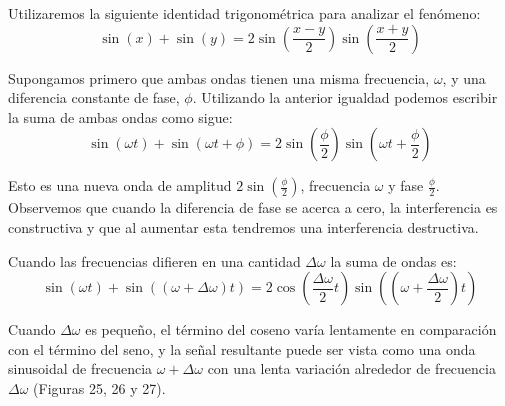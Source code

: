 \documentclass[11pt,a4paper]{article}
\begin{document}
	Utilizaremos la siguiente identidad trigonométrica para analizar el fenómeno:
	$$ \sin(x) + \sin (y) = 2 \sin \left( \frac{x - y}{2} \right) \sin \left( \frac{x + y}{2} \right)$$
	
	Supongamos primero que ambas ondas tienen una misma frecuencia, $\omega$, y una diferencia constante de fase, $\phi$. Utilizando la anterior igualdad podemos escribir la suma de ambas ondas como sigue:
	$$ \sin (\omega t) + \sin (\omega t + \phi) = 2 \sin \left(\frac{\phi}{2} \right) \sin \left( \omega t  + \frac{\phi}{2} \right) $$
	
	Esto es  una nueva onda de amplitud $2 \sin \left( \frac{\phi}{2} \right) $, frecuencia $ \omega $ y fase $ \frac{\phi}{2} $. Observemos que cuando la diferencia de fase se acerca a cero, la interferencia es constructiva y que al aumentar esta tendremos una interferencia destructiva.
	
	Cuando las frecuencias difieren en una cantidad $\Delta \omega $ la suma de ondas es:
	$$ \sin(\omega t) + \sin ((\omega + \Delta \omega)t) = 2 \cos \left( \frac{\Delta \omega}{2} t \right) \sin \left( \left( \omega + \frac{\Delta \omega}{2} \right) t \right) $$
	
	Cuando $\Delta \omega $ es pequeño, el término del coseno varía lentamente en comparación con el término del seno, y la señal resultante puede ser vista como una onda sinusoidal de frecuencia $ \omega + \Delta \omega $ con una lenta variación alrededor de frecuencia $\Delta \omega$ (Figuras 25, 26 y 27).
	
\end{document}
